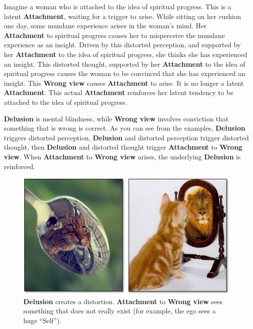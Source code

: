 Imagine a woman who is attached to the idea of spiritual progress. This is a latent \textbf{Attachment}, waiting for a trigger to  arise. While sitting on her cushion one day, some mundane experience arises in the woman’s mind. Her \textbf{Attachment} to spiritual progress causes her to misperceive the mundane experience as an insight. Driven by this distorted perception, and supported by her \textbf{Attachment} to the idea of spiritual progress, she thinks she has experienced an insight. This distorted thought, supported by her \textbf{Attachment} to the idea of spiritual progress causes the woman to be convinced that she has experienced an insight. This \textbf{Wrong view} causes \textbf{Attachment} to arise. It is no longer a latent \textbf{Attachment}. This actual \textbf{Attachment} reinforces her latent tendency to be attached to the idea of spiritual progress.

\textbf{Delusion} is mental blindness, while \textbf{Wrong view} involves conviction that something that is wrong is correct. As you can see from the examples, \textbf{Delusion} triggers distorted perception, \textbf{Delusion} and distorted perception trigger distorted thought, then \textbf{Delusion} and distorted thought trigger \textbf{Attachment} to \textbf{Wrong view}. When \textbf{Attachment} to \textbf{Wrong view} arises, the underlying \textbf{Delusion} is reinforced.

\pagebreak

\begin{figure}[h]
\centering
\includegraphics[width=0.7\linewidth]{./Diagrams/Cats}
\caption{\textbf{Delusion} creates a distortion. \textbf{Attachment} to \textbf{Wrong view} sees something that does not really exist (for example, the ego sees a huge “Self”).}
\label{fig:Cats}
\end{figure}

